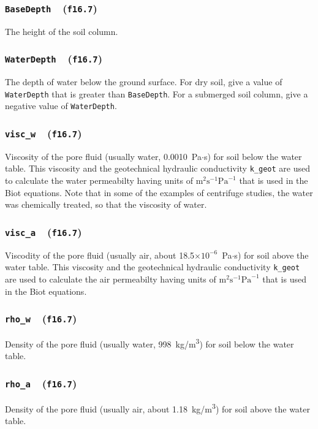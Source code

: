 \documentclass[letterpaper,11pt]{article}
\newcommand{\Var}[2]{\texttt{#1}\ \  (\texttt{#2})}
\begin{document}
\subsubsection[\texttt{BaseDepth}]{\Var{BaseDepth}{f16.7}}\label{sec:BaseDepth}
The height of the soil column.
%
\subsubsection[\texttt{WaterDepth}]{\Var{WaterDepth}{f16.7}}\label{sec:WaterDepth}
The depth of water below the ground surface.
For dry soil, give a value of \texttt{WaterDepth}
that is greater than \texttt{BaseDepth}.
For a submerged soil column, give a negative value of
\texttt{WaterDepth}.
%
\subsubsection[\texttt{visc\_w}]{\Var{visc\_w}{f16.7}}\label{sec:viscw}
Viscosity of the pore fluid (usually water, 0.0010~Pa$\cdot$s)
for soil below the water table.
This viscosity and the geotechnical hydraulic conductivity
\texttt{k\_geot} are used to calculate the
water permeabilty having units
of $\text{m}^{2}\text{s}^{-1}\text{Pa}^{-1}$
that is used in the Biot equations.
Note that in some of the examples of centrifuge studies,
the water was chemically treated,
so that the viscosity of water.
%
\subsubsection[\texttt{visc\_a}]{\Var{visc\_a}{f16.7}}\label{sec:visca}
Viscodity of the pore fluid
(usually air, about 18.5$\times 10^{-6}$~Pa$\cdot$s)
for soil above the water table.
This viscosity and the geotechnical hydraulic conductivity
\texttt{k\_geot} are used to calculate the
air permeabilty having units
of $\text{m}^{2}\text{s}^{-1}\text{Pa}^{-1}$
that is used in the Biot equations.
%
\subsubsection[\texttt{rho\_w}]{\Var{rho\_w}{f16.7}}\label{sec:rhow}
Density of the pore fluid
(usually water, 998~kg/m\textsuperscript{3})
for soil below the water table.
%
\subsubsection[\texttt{rho\_a}]{\Var{rho\_a}{f16.7}}\label{sec:rhoa}
Density of the pore fluid
(usually air, about 1.18~kg/m\textsuperscript{3})
for soil above the water table.
%
\end{document}

